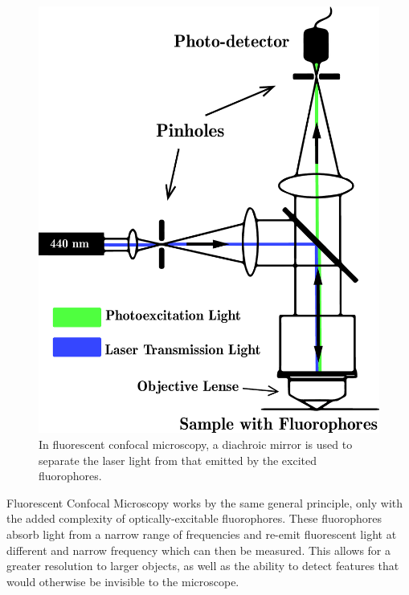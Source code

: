 \begin{figure}
	
	\centering
\includegraphics[width=\linewidth]{Chapters/Figures/confocal_fluorescent_diagram_b}
\caption[Fluorescent Confocal Microscopy]{In fluorescent confocal microscopy, a diachroic mirror is used to separate the laser light from that emitted by the excited fluorophores. }
\label{fig:confocalfluorescentdiagram}
	
	
\end{figure}
	
Fluorescent Confocal Microscopy works by the same general principle, only with the added complexity of optically-excitable fluorophores. These fluorophores absorb light from a narrow range of frequencies and re-emit fluorescent light at different and narrow frequency which can then be measured. This allows for a greater resolution to larger objects, as well as the ability to detect features that would otherwise be invisible to the microscope.  

